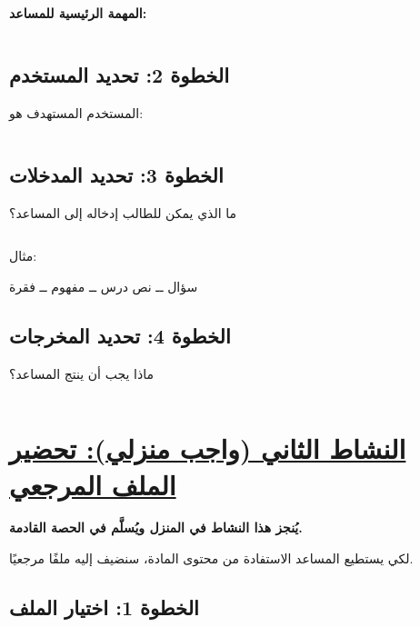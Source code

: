 \documentclass[a4paper]{article}
\begin{document}
\textbf{المهمة الرئيسية للمساعد:}

\[
\boxed{\hspace{15cm}}
\]

\subsection*{\khatt الخطوة 2: تحديد المستخدم}

المستخدم المستهدف هو:

\[
\boxed{\hspace{15cm}}
\]

\subsection*{\khatt الخطوة 3: تحديد المدخلات}

ما الذي يمكن للطالب إدخاله إلى المساعد؟

\[
\boxed{\hspace{15cm}}
\]

مثال:

\begin{center}

سؤال ــ نص درس ــ مفهوم ــ فقرة

\end{center}

\subsection*{\khatt الخطوة 4: تحديد المخرجات}

ماذا يجب أن ينتج المساعد؟

\[
\boxed{\hspace{15cm}}
\]



\section*{\khatt\underline{النشاط الثاني (واجب منزلي): تحضير الملف المرجعي}}

\textbf{يُنجز هذا النشاط في المنزل ويُسلَّم في الحصة القادمة.}

لكي يستطيع المساعد الاستفادة من محتوى المادة،
سنضيف إليه ملفًا مرجعيًا.

\subsection*{\khatt الخطوة 1: اختيار الملف}
\end{document}
